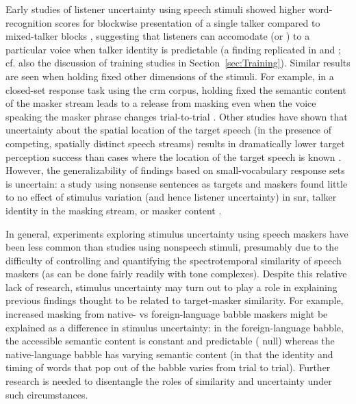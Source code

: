 Early studies of listener uncertainty using speech stimuli showed higher word-recognition scores for blockwise presentation of a single talker compared to mixed-talker blocks \citep{SommersEtAl1994}, suggesting that listeners can accomodate (or ) to a particular voice when talker identity is predictable (a finding replicated in \citealt{BrungartSimpson2004} and \citealt{EricsonEtAl2004}; cf. also the discussion of training studies in Section~\ref{sec:Training}).  
Similar results are seen when holding fixed other dimensions of the stimuli.  For example, in a closed-set response task using the \ac{crm} corpus, holding fixed the semantic content of the masker stream leads to a release from masking even when the voice speaking the masker phrase changes trial-to-trial \citep{BrungartSimpson2004}.  Other studies have shown that uncertainty about the spatial location of the target speech (in the presence of competing, spatially distinct speech streams) results in dramatically lower target perception success than cases where the location of the target speech is known \citep{EricsonEtAl2004, KiddEtAl2005a}.  However, the generalizability of findings based on small-vocabulary response sets is uncertain: a study using nonsense sentences as targets and maskers found little to no effect of stimulus variation (and hence listener uncertainty) in \ac{snr}, talker identity in the masking stream, or masker content \citep{FreymanEtAl2007}.

In general, experiments exploring stimulus uncertainty using speech maskers have been less common than studies using nonspeech stimuli, presumably due to the difficulty of controlling and quantifying the spectrotemporal similarity of speech maskers (as can be done fairly readily with tone complexes).  Despite this relative lack of research, stimulus uncertainty may turn out to play a role in explaining previous findings thought to be related to target-masker similarity.  For example, increased masking from native- vs foreign-language babble maskers \citep[\eg][]{RhebergenEtAl2005, GarciaLecumberriCooke2006, VanEngenBradlow2007, BrouwerEtAl2012} might be explained as a difference in stimulus uncertainty: in the foreign-language babble, the accessible semantic content is constant and predictable (\ie{} null) whereas the native-language babble has varying semantic content (in that the identity and timing of words that pop out of the babble varies from trial to trial).  Further research is needed to disentangle the roles of similarity and uncertainty under such circumstances.  %

